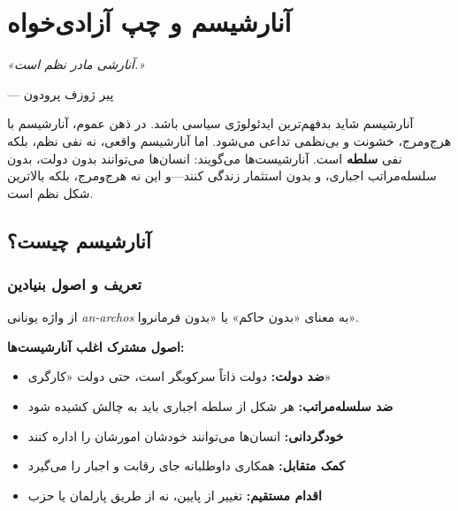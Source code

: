 
\chapter{آنارشیسم و چپ آزادی‌خواه}
\label{ch:anarchism}

\begin{flushright}
\textit{«آنارشی مادر نظم است.»}

— پیر ژوزف پرودون
\end{flushright}


\lettrine[lines=3, lraise=0.1, nindent=0.5em]{\textcolor{OrangeAccent}{آ}}{نارشیسم} 
شاید بدفهم‌ترین ایدئولوژی سیاسی باشد. در ذهن عموم، آنارشیسم با هرج‌ومرج، خشونت و بی‌نظمی تداعی می‌شود. اما آنارشیسم واقعی، نه نفی نظم، بلکه نفی \textbf{سلطه} است. آنارشیست‌ها می‌گویند: انسان‌ها می‌توانند بدون دولت، بدون سلسله‌مراتب اجباری، و بدون استثمار زندگی کنند—و این نه هرج‌ومرج، بلکه بالاترین شکل نظم است.

\section{آنارشیسم چیست؟}

\subsection{تعریف و اصول بنیادین}

\begin{defbox}
از واژه یونانی \textit{an-archos} به معنای «بدون حاکم» یا «بدون فرمانروا».

\textbf{اصول مشترک اغلب آنارشیست‌ها:}
\begin{itemize}[nosep]
    \item \textbf{ضد دولت:} دولت ذاتاً سرکوبگر است، حتی دولت «کارگری»
    \item \textbf{ضد سلسله‌مراتب:} هر شکل از سلطه اجباری باید به چالش کشیده شود
    \item \textbf{خودگردانی:} انسان‌ها می‌توانند خودشان امورشان را اداره کنند
    \item \textbf{کمک متقابل:} همکاری داوطلبانه جای رقابت و اجبار را می‌گیرد
    \item \textbf{اقدام مستقیم:} تغییر از پایین، نه از طریق پارلمان یا حزب
\end{itemize}
\end{defbox}

